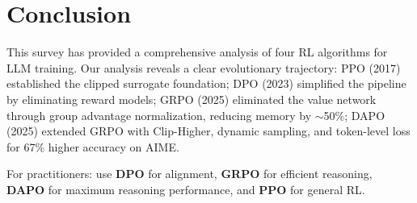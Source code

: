 \documentclass[10pt,twocolumn]{article}
\begin{document}
\section{Conclusion}
\label{sec:conclusion}

This survey has provided a comprehensive analysis of four RL algorithms for LLM training. Our analysis reveals a clear evolutionary trajectory: PPO (2017) established the clipped surrogate foundation; DPO (2023) simplified the pipeline by eliminating reward models; GRPO (2025) eliminated the value network through group advantage normalization, reducing memory by $\sim$50\%; DAPO (2025) extended GRPO with Clip-Higher, dynamic sampling, and token-level loss for 67\% higher accuracy on AIME.

For practitioners: use \textbf{DPO} for alignment, \textbf{GRPO} for efficient reasoning, \textbf{DAPO} for maximum reasoning performance, and \textbf{PPO} for general RL.

\end{document}
